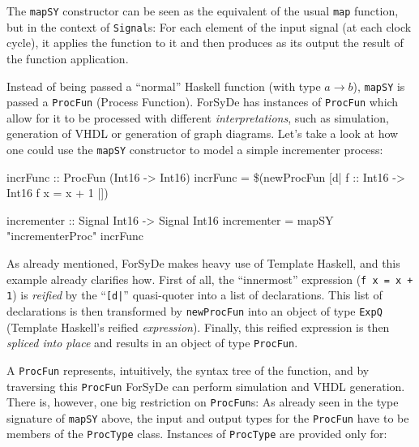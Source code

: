\documentclass[a4paper]{article}
\begin{document}
                The \texttt{mapSY} constructor can be seen as the equivalent of the usual
                \texttt{map} function, but in the context of \texttt{Signal}s: For each element of
                the input signal (at each clock cycle), it applies the function to it and then
                produces as its output the result of the function application.

                Instead of being passed a ``normal'' Haskell function (with type $a → b$),
                \texttt{mapSY} is passed a \texttt{ProcFun} (Process Function). ForSyDe has
                instances of \texttt{ProcFun} which allow for it to be processed with different
                \emph{interpretations}, such as simulation, generation of VHDL or generation of
                graph diagrams. Let's take a look at how one could use the \texttt{mapSY}
                constructor to model a simple incrementer process:
                \begin{haskellcode}
        incrFunc :: ProcFun (Int16 -> Int16)
        incrFunc = \$(newProcFun [d| f :: Int16 -> Int16
                                     f x = x + 1 |])

        incrementer :: Signal Int16 -> Signal Int16
        incrementer = mapSY "incrementerProc" incrFunc
                \end{haskellcode}

                As already mentioned, ForSyDe makes heavy use of Template Haskell, and this example
                already clarifies how. First of all, the ``innermost'' expression
                (\verb;f x = x + 1;) is \emph{reified} by the ``\texttt{[d|}'' quasi-quoter into a
                list of declarations. This list of declarations is then transformed by
                \texttt{newProcFun} into an object of type \texttt{ExpQ} (Template Haskell's
                reified \emph{expression}). Finally, this reified expression is then
                \emph{spliced into place} and results in an object of type \texttt{ProcFun}.

                A \texttt{ProcFun} represents, intuitively, the syntax tree of the function, and
                by traversing this \texttt{ProcFun} ForSyDe can perform simulation and VHDL
                generation. There is, however, one big restriction on \texttt{ProcFun}s: As already
                seen in the type signature of \texttt{mapSY} above, the input and output types for
                the \texttt{ProcFun} have to be members of the \texttt{ProcType} class. Instances of
                \texttt{ProcType} are provided only for:
\end{document}

